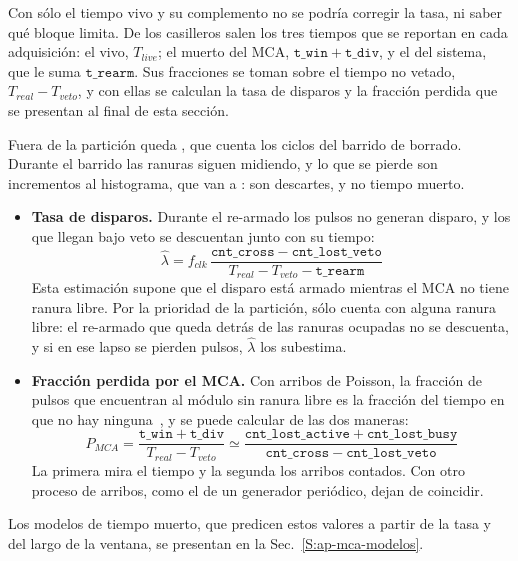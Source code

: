 Con sólo el tiempo vivo y su complemento no se podría corregir la tasa, ni
saber qué bloque limita. De los casilleros salen los tres tiempos que se
reportan en cada adquisición: el vivo, $T_{live}$; el muerto del MCA,
$\mathtt{t\_win} + \mathtt{t\_div}$, y el del sistema, que le suma
$\mathtt{t\_rearm}$. Sus fracciones se toman sobre el tiempo no vetado,
$T_{real} - T_{veto}$, y con ellas se calculan la tasa de disparos y la fracción
perdida que se presentan al final de esta sección.

Fuera de la partición queda , que cuenta los ciclos del barrido de
borrado. Durante el barrido las ranuras siguen midiendo, y lo que se pierde son
incrementos al histograma, que van a : son descartes, y no
tiempo muerto.
\begin{itemize}
  \item \textbf{Tasa de disparos.} Durante el re-armado los pulsos no generan
    disparo, y los que llegan bajo veto se descuentan junto con su tiempo:
    \begin{equation}
      \hat\lambda = f_{clk}\,\frac{\mathtt{cnt\_cross} -
      \mathtt{cnt\_lost\_veto}}{T_{real} - T_{veto} - \mathtt{t\_rearm}}
      \label{e:implmca-lambda}
    \end{equation}
    Esta estimación supone que el disparo está armado mientras el MCA no tiene
    ranura libre. Por la prioridad de la partición,  sólo cuenta
    con alguna ranura libre: el re-armado que queda detrás de las ranuras
    ocupadas no se descuenta, y si en ese lapso se pierden pulsos,
    $\hat\lambda$ los subestima.
  \item \textbf{Fracción perdida por el MCA.} Con arribos de Poisson, la
    fracción de pulsos que encuentran al módulo sin ranura libre es la fracción
    del tiempo en que no hay ninguna~\cite{Wolff1982}, y se puede calcular de
    las dos maneras:
    \begin{equation}
      P_{MCA} = \frac{\mathtt{t\_win} + \mathtt{t\_div}}{T_{real} - T_{veto}}
      \simeq \frac{\mathtt{cnt\_lost\_active} +
      \mathtt{cnt\_lost\_busy}}{\mathtt{cnt\_cross} - \mathtt{cnt\_lost\_veto}}
      \label{e:implmca-pmca}
    \end{equation}
    La primera mira el tiempo y la segunda los arribos contados. Con otro
    proceso de arribos, como el de un generador periódico, dejan de coincidir.
\end{itemize}

Los modelos de tiempo muerto, que predicen estos valores a partir de la tasa y
del largo de la ventana, se presentan en la Sec.~\ref{S:ap-mca-modelos}.

